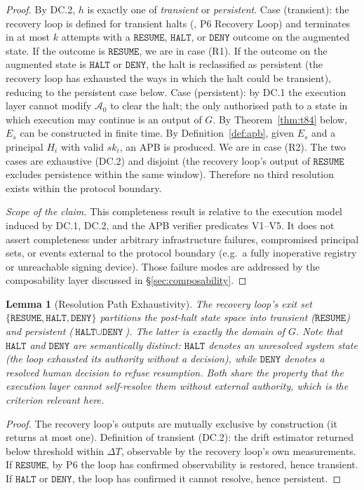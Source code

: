 \documentclass[11pt]{article}
\newtheorem{lemma}[theorem]{Lemma}
\newcommand{\Azero}{\mathcal{A}_0}
\newcommand{\HALT}{\texttt{HALT}}
\newcommand{\RESUME}{\texttt{RESUME}}
\newcommand{\DENY}{\texttt{DENY}}
\newcommand{\Es}{E_s}
\newcommand{\Hi}{H_i}
\newcommand{\ski}{sk_i}
\begin{document}
\begin{proof}
By DC.2, $h$ is exactly one of \emph{transient} or \emph{persistent}.
Case (transient): the recovery loop is defined for transient halts
(\citep{fernandez2026applied}, P6 Recovery Loop) and terminates in at
most $k$ attempts with a $\RESUME$, $\HALT$, or $\DENY$ outcome on the
augmented state. If the outcome is $\RESUME$, we are in case (R1).
If the outcome on the augmented state is $\HALT$ or $\DENY$, the halt
is reclassified as persistent (the recovery loop has exhausted the
ways in which the halt could be transient), reducing to the persistent
case below.
Case (persistent): by DC.1 the execution layer cannot modify $\Azero$
to clear the halt; the only authorised path to a state in which
execution may continue is an output of $G$. By Theorem~\ref{thm:t84}
below, $\Es$ can be constructed in finite time. By
Definition~\ref{def:apb}, given $\Es$ and a principal $\Hi$ with valid
$\ski$, an APB is produced. We are in case (R2).
The two cases are exhaustive (DC.2) and disjoint (the recovery loop's
output of $\RESUME$ excludes persistence within the same window).
Therefore no third resolution exists within the protocol boundary.

\emph{Scope of the claim.}
This completeness result is relative to the execution model induced by
DC.1, DC.2, and the APB verifier predicates V1--V5. It does not assert
completeness under arbitrary infrastructure failures, compromised
principal sets, or events external to the protocol boundary
(e.g.\ a fully inoperative registry or unreachable signing device).
Those failure modes are addressed by the composability layer discussed
in \S\ref{sec:composability}.
\end{proof}

\begin{lemma}[Resolution Path Exhaustivity]
\label{lem:exhaustivity}
The recovery loop's exit set $\{\RESUME, \HALT, \DENY\}$ partitions
the post-halt state space into transient ($\RESUME$) and
persistent ($\HALT \cup \DENY$). The latter is exactly the
domain of $G$.
Note that $\HALT$ and $\DENY$ are semantically distinct:
$\HALT$ denotes an unresolved system state (the loop exhausted its
authority without a decision), while $\DENY$ denotes a resolved human
decision to refuse resumption. Both share the property that the
execution layer cannot self-resolve them without external authority,
which is the criterion relevant here.
\end{lemma}

\begin{proof}
The recovery loop's outputs are mutually exclusive by construction
(it returns at most one). Definition of transient (DC.2): the drift
estimator returned below threshold within $\Delta T$, observable by
the recovery loop's own measurements. If $\RESUME$, by P6 the loop
has confirmed observability is restored, hence transient. If $\HALT$
or $\DENY$, the loop has confirmed it cannot resolve, hence
persistent.
\end{proof}
\end{document}
